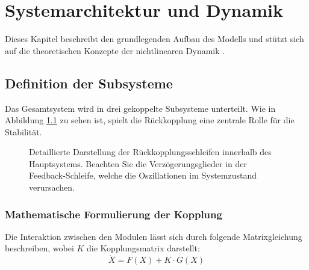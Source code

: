 \chapter{Systemarchitektur und Dynamik}
\label{ch:architektur}

Dieses Kapitel beschreibt den grundlegenden Aufbau des Modells und stützt sich auf die theoretischen Konzepte der nichtlinearen Dynamik \cite{strogatz2018}.

\section{Definition der Subsysteme}
\label{sec:subsysteme}

Das Gesamtsystem wird in drei gekoppelte Subsysteme unterteilt. Wie in Abbildung \ref{fig:regelkreis} zu sehen ist, spielt die Rückkopplung eine zentrale Rolle für die Stabilität.

\begin{figure}[htbp]
    \centering
    
    \caption[Blockschaltbild des gekoppelten Regelkreises]{Detaillierte Darstellung der Rückkopplungsschleifen innerhalb des Hauptsystems. Beachten Sie die Verzögerungsglieder in der Feedback-Schleife, welche die Oszillationen im Systemzustand verursachen.}
    \label{fig:regelkreis}
\end{figure}

\subsection{Mathematische Formulierung der Kopplung}

Die Interaktion zwischen den Modulen lässt sich durch folgende Matrixgleichung beschreiben, wobei $K$ die Kopplungsmatrix darstellt:
$$ \dot{X} = F(X) + K \cdot G(X) $$
